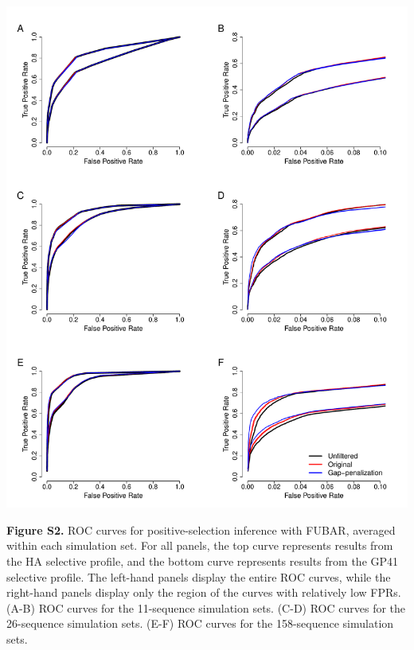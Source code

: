 \documentclass[11pt]{article}
\begin{document}
\newpage
\centerline{\includegraphics[width=6.25in]{Figures/ROC_SI_fubar.pdf}}
\noindent \textbf{Figure S2.} ROC curves for positive-selection inference with FUBAR, averaged within each simulation set. For all panels, the top curve represents results from the HA selective profile, and the bottom curve represents results from the GP41 selective profile. The left-hand panels display the entire ROC curves, while the right-hand panels display only the region of the curves with relatively low FPRs.  (A-B) ROC curves for the 11-sequence simulation sets. (C-D) ROC curves for the 26-sequence simulation sets. (E-F) ROC curves for the 158-sequence simulation sets.

\newpage


	
\end{document}
